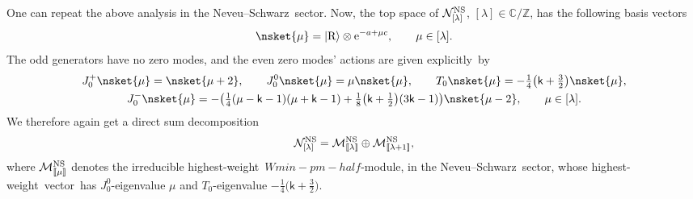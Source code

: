 \documentclass[10pt,a4paper]{amsart}
\numberwithin{equation}{section}
\newcommand{\ee}{\mathrm{e}} %
\newcommand{\kk}{\mathsf{k}} %
\newcommand{\NS}{\textnormal{NS}}
\newcommand{\R}{\textnormal{R}}
\DeclarePairedDelimiter{\brac}{\lparen}{\rparen} %
\DeclarePairedDelimiter{\dbrac}{\llbracket}{\rrbracket} %
\DeclarePairedDelimiter{\ket}{\lvert}{\rangle}
\newcommand{\fld}[1]{\mathbb{#1}} %
\newcommand{\VOA}[1]{\mathsf{#1}} %
\newcommand{\Mod}[1]{\mathcal{#1}} %
\newcommand{\ZZ}{\fld{Z}}
\newcommand{\CC}{\fld{C}}
\newcommand{\swalg}[2]{\VOA{W}_{#1}^{\mathrm{#2}}} %
\newcommand{\smin}[1][\kk]{\swalg{#1}{min}} %
\newcommand{\sminpmhalf}{\smin[\pm 1/2]}
\newcommand{\sfrvac}{\ket{\R}} %
\newcommand{\nnsind}[1]{\Mod{N}^{\NS}_{[#1]}} %
\newcommand{\nnsrel}[1]{\Mod{M}^{\NS}_{\vphantom{[#1]}\smash{\dbrac{#1}}}} %
\newcommand{\ns}{Neveu--Schwarz}
\newcommand{\hw}{highest-weight}
\newcommand{\hwv}{\hw\ vector}
\def\smash#1{#1}
\def\sminpmhalf{Wmin-pm-half}
\begin{document}
One can repeat the above analysis in the \ns\ sector.
Now, the top space of \smash{$\nnsind{\lambda}$}, $[\lambda] \in \CC/\ZZ$, has the following basis vectors\[
	\nsket{\mu} = \sfrvac \otimes \ee^{-a+\mu c}, \qquad \mu \in [\lambda].\]
The odd generators have no zero modes, and the even zero modes' actions are given explicitly~by
\begin{gather*}%
		J^{+}_{0}\nsket{\mu} = \nsket{\mu+2}, \qquad
		J^{0}_{0}\nsket{\mu} = \mu\nsket{\mu}, \qquad
		T_{0}\nsket{\mu} = -\tfrac{1}{4}\brac[\big]{\kk+\tfrac{3}{2}} \nsket{\mu}, \\
		J^{-}_{0}\nsket{\mu} = -\brac[\big]{\tfrac{1}{4}(\mu - \kk - 1)(\mu + \kk - 1) + \tfrac{1}{8}\bigl(\kk+\tfrac{1}{2}\bigr)(3\kk-1)}\nsket{\mu-2},
	\qquad \mu \in [\lambda].
\end{gather*}
We therefore again get a direct sum decomposition
\[
	\nnsind{\lambda} = \nnsrel{\lambda} \oplus \nnsrel{\lambda+1},\]
where \smash{$\nnsrel{\mu}$} denotes the irreducible \hw\ \smash{$\sminpmhalf$}-module, in the \ns\ sector, whose \hwv\ has $J^0_0$-eigenvalue $\mu$ and $T_0$-eigenvalue $-\frac{1}{4}\big(\kk+\frac{3}{2}\big)$.
\end{document}
